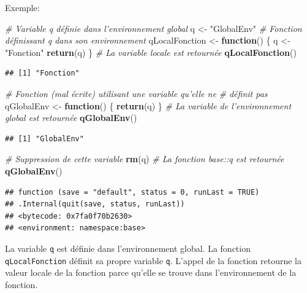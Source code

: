 \documentclass[
  12pt,
  french,
  a4paper,
  extrafontsizes,onecolumn,openright
  ]{memoir}
\newenvironment{Shaded}{\begin{snugshade}}{\end{snugshade}}
\newcommand{\CommentTok}[1]{\textcolor[rgb]{0.56,0.35,0.01}{\textit{#1}}}
\newcommand{\ControlFlowTok}[1]{\textcolor[rgb]{0.13,0.29,0.53}{\textbf{#1}}}
\newcommand{\KeywordTok}[1]{\textcolor[rgb]{0.13,0.29,0.53}{\textbf{#1}}}
\newcommand{\NormalTok}[1]{#1}
\newcommand{\StringTok}[1]{\textcolor[rgb]{0.31,0.60,0.02}{#1}}
\begin{document}
Exemple:

\scriptsize

\begin{Shaded}
\begin{Highlighting}[]
\CommentTok{# Variable q définie dans l'environnement global}
\NormalTok{q <-}\StringTok{ "GlobalEnv"}
\CommentTok{# Fonction définissant q dans son environnement}
\NormalTok{qLocalFonction <-}\StringTok{ }\ControlFlowTok{function}\NormalTok{() \{}
\NormalTok{    q <-}\StringTok{ "Fonction"}
    \KeywordTok{return}\NormalTok{(q)}
\NormalTok{\}}
\CommentTok{# La variable locale est retournée}
\KeywordTok{qLocalFonction}\NormalTok{()}
\end{Highlighting}
\end{Shaded}

\begin{verbatim}
## [1] "Fonction"
\end{verbatim}

\begin{Shaded}
\begin{Highlighting}[]
\CommentTok{# Fonction (mal écrite) utilisant une variable qu'elle ne}
\CommentTok{# définit pas}
\NormalTok{qGlobalEnv <-}\StringTok{ }\ControlFlowTok{function}\NormalTok{() \{}
    \KeywordTok{return}\NormalTok{(q)}
\NormalTok{\}}
\CommentTok{# La variable de l'environnement global est retournée}
\KeywordTok{qGlobalEnv}\NormalTok{()}
\end{Highlighting}
\end{Shaded}

\begin{verbatim}
## [1] "GlobalEnv"
\end{verbatim}

\begin{Shaded}
\begin{Highlighting}[]
\CommentTok{# Suppression de cette variable}
\KeywordTok{rm}\NormalTok{(q)}
\CommentTok{# La fonction base::q est retournée}
\KeywordTok{qGlobalEnv}\NormalTok{()}
\end{Highlighting}
\end{Shaded}

\begin{verbatim}
## function (save = "default", status = 0, runLast = TRUE) 
## .Internal(quit(save, status, runLast))
## <bytecode: 0x7fa0f70b2630>
## <environment: namespace:base>
\end{verbatim}

\normalsize

La variable \texttt{q} est définie dans l'environnement global.
La fonction \texttt{qLocalFonction} définit sa propre variable \texttt{q}.
L'appel de la fonction retourne la valeur locale de la fonction parce qu'elle se trouve dans l'environnement de la fonction.
\end{document}
